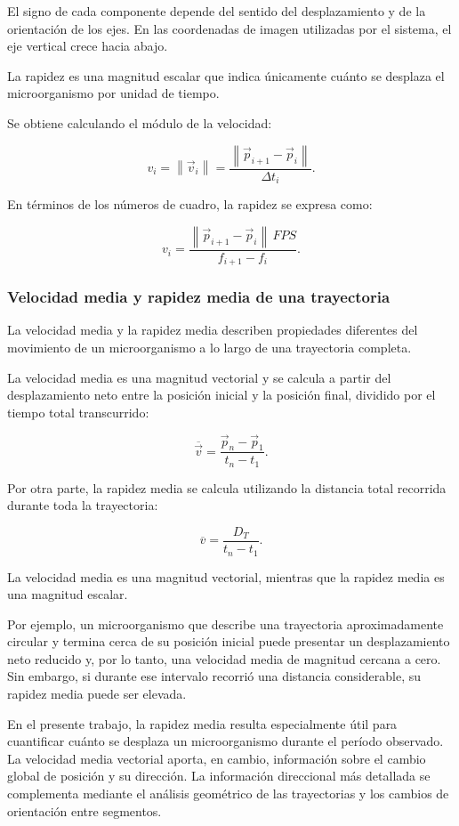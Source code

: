 El signo de cada componente depende del sentido del desplazamiento y de la orientación de los ejes. En las coordenadas de imagen utilizadas por el sistema, el eje vertical crece hacia abajo.

La rapidez es una magnitud escalar que indica únicamente cuánto se desplaza el microorganismo por unidad de tiempo.

Se obtiene calculando el módulo de la velocidad:

\[
v_i=\left\|\vec{v}_i\right\|
=\frac{\left\|\vec{p}_{i+1}-\vec{p}_i\right\|}{\Delta t_i}.
\]

En términos de los números de cuadro, la rapidez se expresa como:

\[
v_i=
\frac{\left\|\vec{p}_{i+1}-\vec{p}_i\right\|\,FPS}
{f_{i+1}-f_i}.
\]

\subsubsection{Velocidad media y rapidez media de una trayectoria}

La velocidad media y la rapidez media describen propiedades diferentes del movimiento de un microorganismo a lo largo de una trayectoria completa.

La velocidad media es una magnitud vectorial y se calcula a partir del desplazamiento neto entre la posición inicial y la posición final, dividido por el tiempo total transcurrido:

\[
\overline{\vec{v}}=
\frac{\vec{p}_n-\vec{p}_1}{t_n-t_1}.
\]

Por otra parte, la rapidez media se calcula utilizando la distancia total recorrida durante toda la trayectoria:

\[
\overline{v}=\frac{D_T}{t_n-t_1}.
\]

La velocidad media es una magnitud vectorial, mientras que la rapidez media es una magnitud escalar.

Por ejemplo, un microorganismo que describe una trayectoria aproximadamente circular y termina cerca de su posición inicial puede presentar un desplazamiento neto reducido y, por lo tanto, una velocidad media de magnitud cercana a cero. Sin embargo, si durante ese intervalo recorrió una distancia considerable, su rapidez media puede ser elevada.

En el presente trabajo, la rapidez media resulta especialmente útil para cuantificar cuánto se desplaza un microorganismo durante el período observado. La velocidad media vectorial aporta, en cambio, información sobre el cambio global de posición y su dirección. La información direccional más detallada se complementa mediante el análisis geométrico de las trayectorias y los cambios de orientación entre segmentos.

